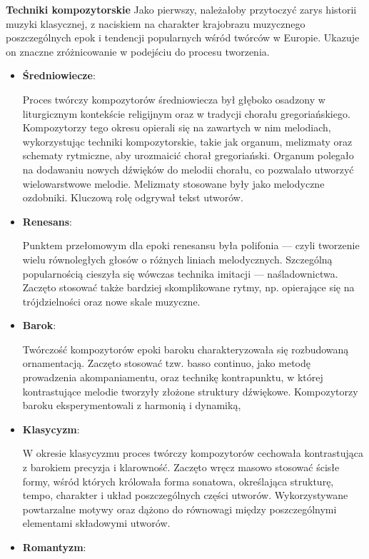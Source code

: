 \documentclass[12pt]{article}
\begin{document}
\textbf{Techniki kompozytorskie}
Jako pierwszy, należałoby przytoczyć zarys historii muzyki klasycznej, z naciskiem na charakter krajobrazu muzycznego
poszczególnych epok i tendencji popularnych wśród twórców w Europie. Ukazuje on znaczne zróżnicowanie w podejściu do procesu tworzenia.
\begin{itemize}
	\item \textbf{Średniowiecze}:
	      
	      Proces twórczy kompozytorów średniowiecza był głęboko osadzony w liturgicznym kontekście religijnym oraz w tradycji
	      chorału gregoriańskiego.
	      Kompozytorzy tego okresu opierali się na zawartych w nim melodiach, wykorzystując techniki kompozytorskie, takie jak organum,
	      melizmaty oraz schematy rytmiczne, aby urozmaicić chorał gregoriański.
	      Organum polegało na dodawaniu nowych dźwięków do melodii chorału, co pozwalało utworzyć wielowarstwowe melodie.
	      Melizmaty stosowane były jako melodyczne ozdobniki. Kluczową rolę odgrywał tekst utworów.
	\item \textbf{Renesans}:
	      
	      Punktem przełomowym dla epoki renesansu była polifonia — czyli tworzenie wielu równoległych głosów o różnych liniach melodycznych.
	      Szczególną popularnością cieszyła się wówczas technika imitacji — naśladownictwa.
	      Zaczęto stosować także bardziej skomplikowane rytmy, np. opierające się na trójdzielności oraz nowe skale muzyczne.
	\item \textbf{Barok}:
	      
	      Twórczość kompozytorów epoki baroku charakteryzowała się rozbudowaną ornamentacją.
	      Zaczęto stosować tzw. basso continuo, jako metodę prowadzenia akompaniamentu, oraz technikę kontrapunktu,
	      w której kontrastujące melodie tworzyły złożone struktury dźwiękowe.
	      Kompozytorzy baroku eksperymentowali z harmonią i dynamiką,
	\item \textbf{Klasycyzm}:
	      
	      W okresie klasycyzmu proces twórczy kompozytorów cechowała kontrastująca z barokiem precyzja i klarowność.
	      Zaczęto wręcz masowo stosować ścisłe formy, wśród których królowała forma sonatowa, określająca strukturę, tempo,
	      charakter i układ poszczególnych części utworów.
	      Wykorzystywane powtarzalne motywy oraz dążono do równowagi między poszczególnymi elementami składowymi utworów.
	\item \textbf{Romantyzm}:
	      

\end{itemize}
\end{document}
